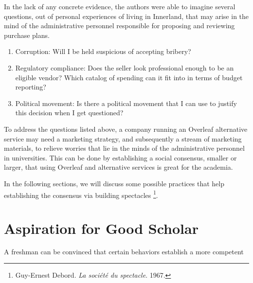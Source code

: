 \documentclass[a4paper,11pt]{article}
\begin{document}
In the lack of any concrete evidence, the authors were able to imagine several questions,
out of personal experiences of living in Innerland,
that may arise in the mind of the administrative personnel responsible for proposing and reviewing purchase plans.

\begin{enumerate}
    \item Corruption: Will I be held suspicious of accepting bribery?
    \item Regulatory compliance: Does the seller look professional enough to be an eligible vendor?
        Which catalog of spending can it fit into in terms of budget reporting?
    \item Political movement: Is there a political movement that I can use to justify this decision when I get questioned?
\end{enumerate}

To address the questions listed above,
a company running an Overleaf alternative service may need a marketing strategy,
and subsequently a stream of marketing materials,
to relieve worries that lie in the minds of the administrative personnel in universities.
This can be done by establishing a social consensus, smaller or larger,
that using Overleaf and alternative services is great for the academia.

In the following sections, we will discuss some possible practices
that help establishing the consensus via building spectacles
\footnote{Guy-Ernest Debord. \textit{La société du spectacle}. 1967.}.





\section{Aspiration for Good Scholar}
A freshman can be convinced that certain behaviors establish a more competent 
\end{document}
